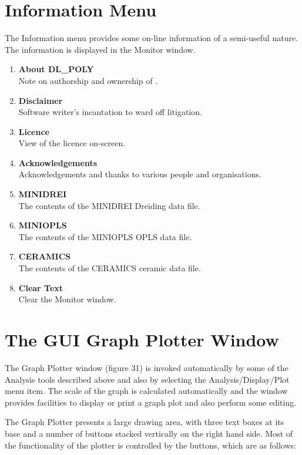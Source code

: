 \section{Information Menu}
\label{infomenu}
The Information menu provides some on-line information of a
semi-useful nature. The information is displayed in the Monitor window.
\begin{enumerate}
\item {\bf About DL\_POLY}\\
Note on authorship and ownership of \DD{}. 
\item {\bf Disclaimer}\\
Software writer's incantation to ward off litigation.
\item {\bf Licence}\\
View of the \DD{} licence on-screen.
\item {\bf Acknowledgements}\\
Acknowledgements and thanks to various people and organisations.
\item {\bf MINIDREI}\\
The contents of the MINIDREI Dreiding data file.
\item {\bf MINIOPLS}\\
The contents of the MINIOPLS OPLS data file.
\item {\bf CERAMICS}\\
The contents of the CERAMICS ceramic data file.
\item {\bf Clear Text}\\
Clear the Monitor window.
\end{enumerate}

\section{The GUI Graph Plotter Window}

\label{grafplot}
The Graph Plotter window (figure 31) is invoked automatically by some
of the Analysis tools described above and also by selecting the
Analysis/Display/Plot menu item. The scale of the graph is
calculated automatically and the window provides facilities to
display or print a graph plot and also perform some editing.

The Graph Plotter presents a large drawing area, with three text
boxes at its base and a number of buttons stacked vertically on the
right hand side. Most of the functionality of the plotter is
controlled by the buttons, which are as follows:

